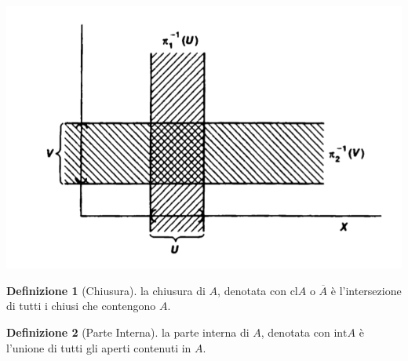 \documentclass[10pt,a4paper]{article}
\theoremstyle{definition}
\newtheorem{defi}{Definizione}
\theoremstyle{plain}
\theoremstyle{remark}
\theoremstyle{remark}
\begin{document}
\begin{center}
\includegraphics[scale=0.5]{prebaseprod.png} 
\end{center}




\begin{defi}[Chiusura] la chiusura di $A$, denotata con $\text{cl}A$ o $\overline{A}$ è l'intersezione di tutti i chiusi che contengono $A$.
\end{defi}

\begin{defi}[Parte Interna] la parte interna di $A$, denotata con $\text{int}A$ è l'unione di tutti gli aperti contenuti in $A$.
\end{defi}
\end{document}
